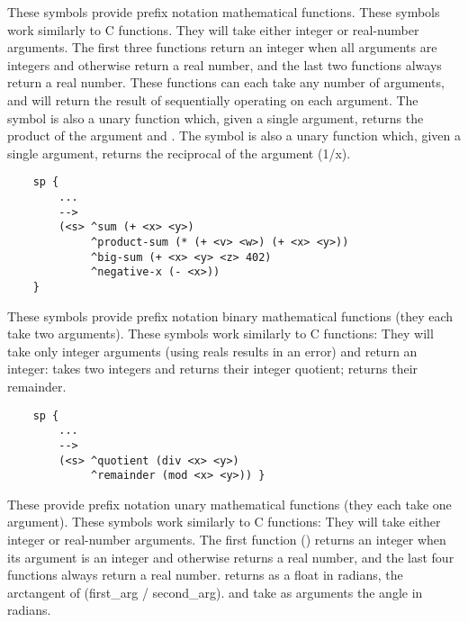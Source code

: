 \begin{description}
	
\item [\soarb{+, -, *, /} --- ]
	These symbols provide prefix notation mathematical functions. These symbols work similarly to C functions.  They will take either integer or real-number arguments. The first three functions return an integer when all arguments are integers and otherwise return a real number, and the last two functions always return a real number. These functions can each take any number of arguments, and will return the result of sequentially operating on each argument. The \soar{-} symbol is also a unary function which, given a single argument, returns the product of the argument and .  The \soar{/} symbol is also a unary function which, given a single argument, returns the reciprocal of the argument (1/x).

	\begin{verbatim}
	sp {
	    ...
	    -->
	    (<s> ^sum (+ <x> <y>)
	         ^product-sum (* (+ <v> <w>) (+ <x> <y>))
	         ^big-sum (+ <x> <y> <z> 402)
	         ^negative-x (- <x>))
	}
	\end{verbatim}

\item [\soarb{div, mod} --- ]
	These symbols provide prefix notation binary mathematical functions (they each take two arguments). These symbols work similarly to C functions: They will take only integer arguments (using reals results in an error) and return an integer:  takes two integers and returns their integer quotient;  returns their remainder.

	\begin{verbatim}
	sp {
	    ...
	    -->
	    (<s> ^quotient (div <x> <y>)
	         ^remainder (mod <x> <y>)) }
	\end{verbatim}

\item [\soarb{abs, atan2, sqrt, sin, cos} --- ]   
	These provide prefix notation unary mathematical functions (they each take one argument). These symbols work similarly to C functions: They will take either integer or real-number arguments. The first function () returns an integer when its argument is an integer and otherwise returns a real number, and the last four functions always return a real number.   returns as a float in radians, the arctangent of (first\_arg / second\_arg).  and  take as arguments the angle in radians.


\end{description}

